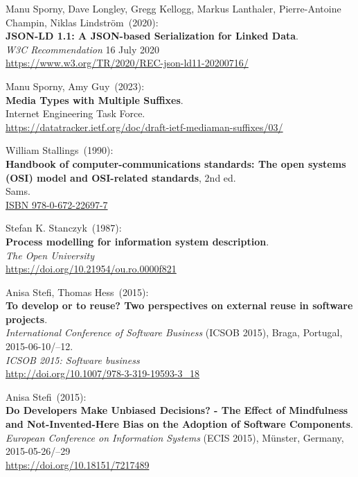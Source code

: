 \begin{thebibliography}{9}
Manu Sporny, Dave Longley, Gregg Kellogg, Markus Lanthaler, Pierre-Antoine Champin, Niklas Lindström~(2020): \\
\textbf{JSON-LD 1.1: A JSON-based Serialization for Linked Data}.\\
\emph{W3C Recommendation} 16 July 2020\\
\url{https://www.w3.org/TR/2020/REC-json-ld11-20200716/}

Manu Sporny, Amy Guy~(2023): \\
\textbf{{Media Types with Multiple Suffixes}}.\\
Internet Engineering Task Force.\\
\url{https://datatracker.ietf.org/doc/draft-ietf-mediaman-suffixes/03/}
 
 William Stallings~(1990): \\
\textbf{Handbook of computer-communications standards: {The} open systems ({OSI}) model and {OSI-related} standards}, 2nd ed. \\
Sams.\\
\href{https://identifiers.org/isbn/9780672226977}{ISBN 978-0-672-22697-7}
 
Stefan K. Stanczyk~(1987): \\
\textbf{Process modelling for information system description}.\\
\emph{The Open University} \\
\url{https://doi.org/10.21954/ou.ro.0000f821}

Anisa Stefi, Thomas Hess~(2015): \\
\textbf{To develop or to reuse? Two perspectives on external reuse in software projects}. \\
\emph{International Conference of Software Business} (ICSOB 2015), Braga, Portugal, 2015-06-10/--12.\\
\emph{ICSOB 2015: Software business} \\
\url{http://doi.org/10.1007/978-3-319-19593-3_18}

Anisa Stefi~(2015): \\
\textbf{Do Developers Make Unbiased Decisions? - The Effect of Mindfulness and Not-Invented-Here Bias on the Adoption of Software Components}. \\
\emph{European Conference on Information Systems} (ECIS 2015), Münster, Germany, 2015-05-26/--29 \\
\url{https://doi.org/10.18151/7217489}


\end{thebibliography}
